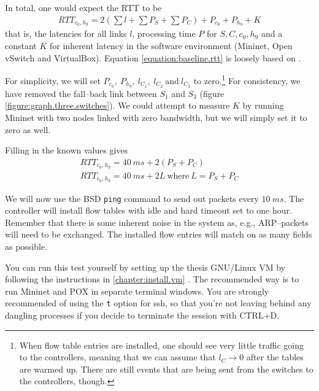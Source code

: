 In total, one would expect the \acf{RTT} to be
\begin{gather}
  RTT_{c_0, h_9} = 2\left( \sum l + \sum P_S + \sum P_C \right) + P_{c_0} + P_{h_9} + K
  \label{equation:baseline.rtt}
\end{gather}%
that is, the latencies for all links $l$, processing time $P$ for
$S,C,c_0,h_9$ and a constant $K$ for inherent latency in the software
environment (Mininet, Open vSwitch and VirtualBox).  Equation
\ref{equation:baseline.rtt} is loosely based on
\cite{DBLP:conf/cnsm/PhemiusB13}.

For simplicity, we will set $P_{c_0},~P_{h_9},~l_{C_1},~l_{C_2}~\text{and}~
l_{C_3}$ to zero.\footnote{When flow table entries are installed, one should
see very little traffic going to the controllers, meaning that we can
assume that $l_{C} \to 0$ after the tables are warmed up.
There are still events that are being sent from the switches to the
controllers, though.}
For consistency, we have removed the fall--back link
between $S_1$ and $S_3$ (figure \ref{figure:graph.three.switches}).
We could attempt to measure $K$ by running Mininet with two nodes linked
with zero bandwidth, but we will simply set it to zero as well.

Filling in the known values gives
\begin{gather}
  RTT_{c_0,h_9} = 40~ms + 2\left( P_S + P_C \right)
  \\
  RTT_{c_0,h_9} = 40~ms + 2L~\text{where}~L = P_S + P_C
  \label{equation:expected.baseline.rtt}
\end{gather}

We will now use the BSD \texttt{ping} command to send out packets every
$10~ms$.  The controller will install flow tables with idle and hard timeout
set to one hour.  Remember that there is some inherent noise in the system
as, e.g., ARP--packets will need to be exchanged.  The installed flow
entries will match on as many fields as possible.

You can run this test yourself by setting up the thesis GNU/Linux VM
by following the instructions in \ref{chapter:install.vm}
. The recommended way is to run Mininet and POX
in separate terminal windows. You are strongly recommended of using the
\texttt{\-{}t} option for ssh, so that you're not leaving behind any
dangling processes if you decide to terminate the session with CTRL+D.

